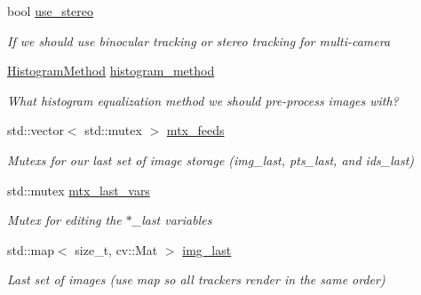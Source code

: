 \begin{DoxyCompactItemize}
\mbox{\label{classov__core_1_1TrackBase_a33375ebbd4b3ebcd69c782e897847276}} 
bool \hyperlink{classov__core_1_1TrackBase_a33375ebbd4b3ebcd69c782e897847276}{use\+\_\+stereo}
\begin{DoxyCompactList}\small\item\em If we should use binocular tracking or stereo tracking for multi-\/camera \end{DoxyCompactList}\item 
\mbox{\label{classov__core_1_1TrackBase_adbd2200d5a77254ee57e5a86f9e367c6}} 
\hyperlink{classov__core_1_1TrackBase_aa4b34a5dce99b59522d57bf9278c9a1a}{Histogram\+Method} \hyperlink{classov__core_1_1TrackBase_adbd2200d5a77254ee57e5a86f9e367c6}{histogram\+\_\+method}
\begin{DoxyCompactList}\small\item\em What histogram equalization method we should pre-\/process images with? \end{DoxyCompactList}\item 
\mbox{\label{classov__core_1_1TrackBase_a8d9a970b148abdee71e1ace835c38c7c}} 
std\+::vector$<$ std\+::mutex $>$ \hyperlink{classov__core_1_1TrackBase_a8d9a970b148abdee71e1ace835c38c7c}{mtx\+\_\+feeds}
\begin{DoxyCompactList}\small\item\em Mutexs for our last set of image storage (img\+\_\+last, pts\+\_\+last, and ids\+\_\+last) \end{DoxyCompactList}\item 
\mbox{\label{classov__core_1_1TrackBase_afc70de91df5ec14f4db66414a71f0fbb}} 
std\+::mutex \hyperlink{classov__core_1_1TrackBase_afc70de91df5ec14f4db66414a71f0fbb}{mtx\+\_\+last\+\_\+vars}
\begin{DoxyCompactList}\small\item\em Mutex for editing the $\ast$\+\_\+last variables \end{DoxyCompactList}\item 
\mbox{\label{classov__core_1_1TrackBase_a84396d08375c2c796fc759de12d28469}} 
std\+::map$<$ size\+\_\+t, cv\+::\+Mat $>$ \hyperlink{classov__core_1_1TrackBase_a84396d08375c2c796fc759de12d28469}{img\+\_\+last}
\begin{DoxyCompactList}\small\item\em Last set of images (use map so all trackers render in the same order) \end{DoxyCompactList}\item 

\end{DoxyCompactItemize}
